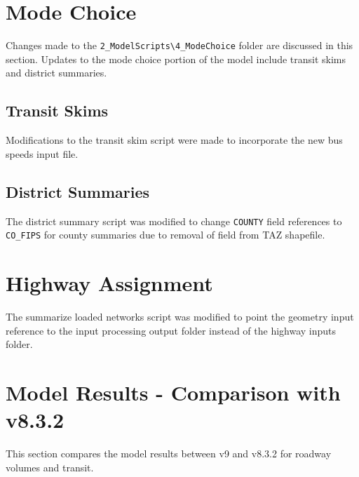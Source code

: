 \documentclass[
  letterpaper,
  DIV=11,
  numbers=noendperiod,
  titlepage=false]{scrreprt}
\begin{document}

\hypertarget{mode-choice-1}{%
\chapter{Mode Choice}\label{mode-choice-1}}

Changes made to the
\texttt{2\_ModelScripts\textbackslash{}4\_ModeChoice} folder are
discussed in this section. Updates to the mode choice portion of the
model include transit skims and district summaries.

\hypertarget{transit-skims}{%
\section{Transit Skims}\label{transit-skims}}

Modifications to the transit skim script were made to incorporate the
new bus speeds input file.

\hypertarget{district-summaries}{%
\section{District Summaries}\label{district-summaries}}

The district summary script was modified to change \texttt{COUNTY} field
references to \texttt{CO\_FIPS} for county summaries due to removal of
field from TAZ shapefile.


\hypertarget{highway-assignment}{%
\chapter{Highway Assignment}\label{highway-assignment}}

The summarize loaded networks script was modified to point the geometry
input reference to the input processing output folder instead of the
highway inputs folder.


\hypertarget{model-results---comparison-with-v8.3.2}{%
\chapter{Model Results - Comparison with
v8.3.2}\label{model-results---comparison-with-v8.3.2}}

This section compares the model results between v9 and v8.3.2 for
roadway volumes and transit.
\end{document}
